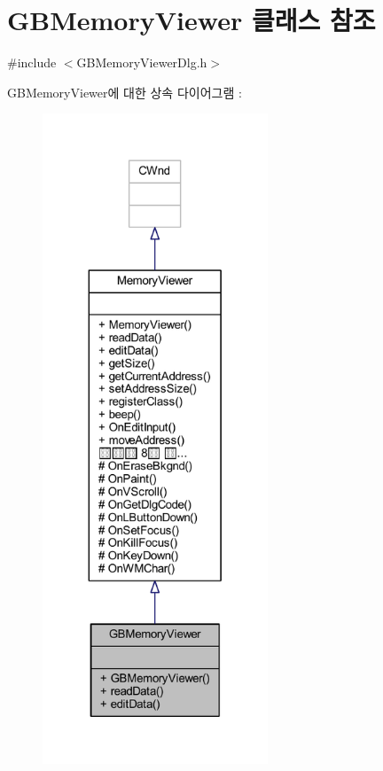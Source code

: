 \hypertarget{class_g_b_memory_viewer}{}\section{G\+B\+Memory\+Viewer 클래스 참조}
\label{class_g_b_memory_viewer}


{\ttfamily \#include $<$G\+B\+Memory\+Viewer\+Dlg.\+h$>$}



G\+B\+Memory\+Viewer에 대한 상속 다이어그램 \+: \nopagebreak
\begin{figure}[H]
\begin{center}
\leavevmode
\includegraphics[height=550pt]{class_g_b_memory_viewer__inherit__graph}
\end{center}
\end{figure}


